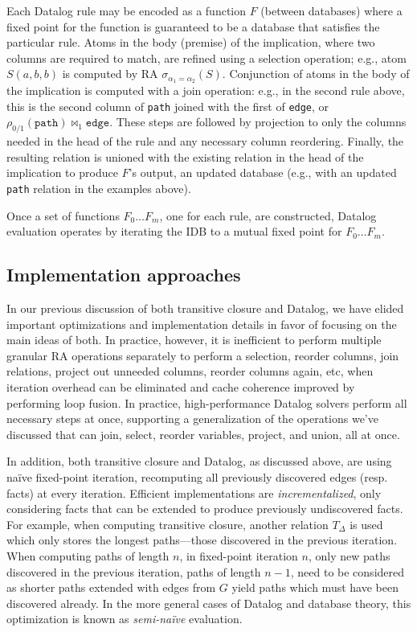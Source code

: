 Each Datalog rule may be encoded as a function $F$ (between databases) where a fixed point for the function is guaranteed to be a database that satisfies the particular rule. Atoms in the body (premise) of the implication, where two columns are required to match, are refined using a selection operation; e.g., atom $S(a,b,b)$ is computed by RA $\sigma_{\alpha_1 = \alpha_2}(S)$. Conjunction of atoms in the body of the implication is computed with a join operation: e.g., in the second rule above, this is the second column of \texttt{path} joined with the first of \texttt{edge}, or $\rho_{0 / 1}(\texttt{path}) \bowtie_1 \texttt{edge}$. These steps are followed by projection to only the columns needed in the head of the rule and any necessary column reordering. Finally, the resulting relation is unioned with the existing relation in the head of the implication to produce $F$'s output, an updated database (e.g., with an updated \texttt{path} relation in the examples above).

Once a set of functions $F_0 \ldots F_m$, one for each rule, are constructed, Datalog evaluation operates by iterating the IDB to a mutual fixed point for $F_0 \ldots F_m$.


\subsection{Implementation approaches}

In our previous discussion of both transitive closure and Datalog, we have elided important optimizations and implementation details in favor of focusing on the main ideas of both. In practice, however, it is inefficient to perform multiple granular RA operations separately to perform a selection, reorder columns, join relations, project out unneeded columns, reorder columns again, etc, when iteration overhead can be eliminated and cache coherence improved by performing loop fusion. In practice, high-performance Datalog solvers perform all necessary steps at once, supporting a generalization of the operations we've discussed that can join, select, reorder variables, project, and union, all at once.  

In addition, both transitive closure and Datalog, as discussed above, are using na\"ive fixed-point iteration, recomputing all previously discovered edges (resp. facts) at every iteration. Efficient implementations are \emph{incrementalized}, only considering facts that can be extended to produce previously undiscovered facts. For example, when computing transitive closure, another relation $T_\Delta$ is used which only stores the longest paths---those discovered in the previous iteration. When computing paths of length $n$, in fixed-point iteration $n$, only new paths discovered in the previous iteration, paths of length $n-1$, need to be considered as shorter paths extended with edges from $G$ yield paths which must have been discovered already. In the more general cases of Datalog and database theory, this optimization is known as \emph{semi-na\"ive} evaluation.

